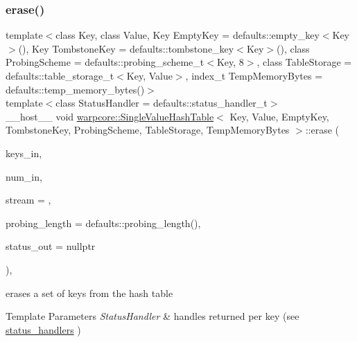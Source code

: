 \subsubsection{\texorpdfstring{erase()}{erase()}\hspace{0.1cm}{\footnotesize\ttfamily [2/2]}}
{\footnotesize\ttfamily template$<$class Key, class Value, Key Empty\+Key = defaults\+::empty\+\_\+key$<$\+Key$>$(), Key Tombstone\+Key = defaults\+::tombstone\+\_\+key$<$\+Key$>$(), class Probing\+Scheme = defaults\+::probing\+\_\+scheme\+\_\+t$<$\+Key, 8$>$, class Table\+Storage = defaults\+::table\+\_\+storage\+\_\+t$<$\+Key, Value$>$, index\+\_\+t Temp\+Memory\+Bytes = defaults\+::temp\+\_\+memory\+\_\+bytes()$>$ \\
template$<$class Status\+Handler  = defaults\+::status\+\_\+handler\+\_\+t$>$ \\
\+\_\+\+\_\+host\+\_\+\+\_\+ void \hyperlink{classwarpcore_1_1SingleValueHashTable}{warpcore\+::\+Single\+Value\+Hash\+Table}$<$ Key, Value, Empty\+Key, Tombstone\+Key, Probing\+Scheme, Table\+Storage, Temp\+Memory\+Bytes $>$\+::erase (\begin{DoxyParamCaption}\item[{const key\+\_\+type $\ast$const}]{keys\+\_\+in,  }\item[{const index\+\_\+type}]{num\+\_\+in,  }\item[{const cuda\+Stream\+\_\+t}]{stream = {},  }\item[{const index\+\_\+type}]{probing\+\_\+length = {\ttfamily defaults\+:\+:probing\+\_\+length()},  }\item[{typename Status\+Handler\+::base\+\_\+type $\ast$const}]{status\+\_\+out = {\ttfamily nullptr} }\end{DoxyParamCaption})\hspace{0.3cm}{\ttfamily [inline]}, {\ttfamily [noexcept]}}



erases a set of keys from the hash table 


\begin{DoxyTemplParams}{Template Parameters}
{\em Status\+Handler} & handles returned per key (see {\ttfamily \hyperlink{namespacewarpcore_1_1status__handlers}{status\+\_\+handlers}} ) \\
\hline
\end{DoxyTemplParams}

